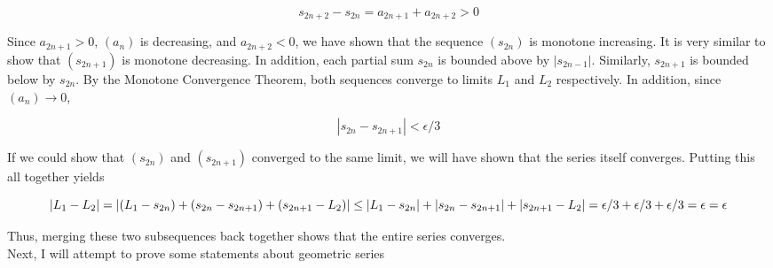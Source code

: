 \documentclass{article}
\begin{document}
\begin{equation}
    s_{2n+2} - s_{2n} = a_{2n+1} + a_{2n+2} > 0
\end{equation}

Since $a_{2n+1} > 0$, $(a_n)$ is decreasing, and $a_{2n+2} < 0$, we have shown that the sequence $(s_{2n})$ is monotone increasing. It is very similar to show that $(s_{2n+1})$ is monotone decreasing. In addition, each partial sum $s_{2n}$ is bounded above by $|s_{2n-1}|$. Similarly, $s_{2n+1}$ is bounded below by $s_{2n}$. By the Monotone Convergence Theorem, both sequences converge to limits $L_1$ and $L_2$ respectively. In addition, since $(a_n) \rightarrow 0$, 

\begin{equation}
    |s_{2n} - s_{2n+1}| < \epsilon / 3
\end{equation}

If we could show that $(s_{2n})$ and $(s_{2n+1})$ converged to the same limit, we will have shown that the series itself converges. Putting this all together yields 

\begin{equation}
    |L_1 - L_2| \\
    = | (L_1 - s_{2n}) + (s_{2n} - s_{2n+1}) + (s_{2n+1} - L_2) | 
    \leq |L_1 - s_{2n}| + |s_{2n} - s_{2n+1}| + |s_{2n+1} - L_2| 
    = \epsilon / 3 +  \epsilon / 3 +  \epsilon / 3 = \epsilon 
    = \epsilon
\end{equation}

Thus, merging these two subsequences back together shows that the entire series converges. \\

Next, I will attempt to prove some statements about geometric series
\end{document}
